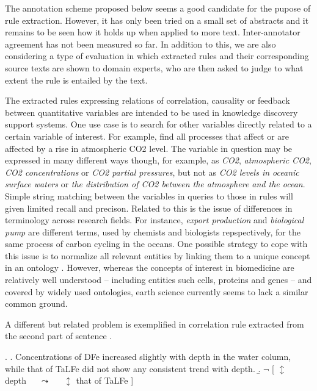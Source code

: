 \documentclass[10pt, a4paper]{article}
\begin{document}
The annotation scheme proposed below seems a good candidate for the pupose of rule extraction.
However, it has only been tried on a small set of abstracts and it remains to be seen how it holds up when applied to more text.
Inter-annotator agreement has not been measured so far.
In addition to this, we are also considering a type of evaluation in which extracted rules and their corresponding source texts are shown to domain experts, who are then asked to judge to what extent the rule is entailed by the text. 


The extracted rules expressing relations of correlation, causality or feedback between quantitative variables are intended to be used in knowledge discovery support systems.
One use case is to search for other variables directly related to a certain variable of interest.
For example, find all processes that affect or are affected by a rise in atmospheric CO2 level.
The variable in question may be expressed in many different ways though, for example, as \emph{CO2}, \emph{atmospheric CO2}, \emph{CO2 concentrations} or \emph{CO2 partial pressures}, but not as \emph{ CO2 levels in oceanic surface waters} or \emph{the distribution of CO2 between the atmosphere and the ocean}.
Simple string matching between the variables in queries to those in rules will given limited recall and precison.
Related to this is the issue of differences in terminology across research fields.
For instance, \emph{export production} and \emph{biological pump} are different terms, used by chemists and biologists repspectively, for the same process of carbon cycling in the oceans. 
One possible strategy to cope with this issue is to normalize all relevant entities by linking them to a unique concept in an ontology \cite{Bada2012Concept}.
However, whereas the concepts of interest in biomedicine are relatively well understood -- including entities such cells, proteins and genes -- and covered by widely used ontologies, earth science currently seems to lack a similar common ground.

A different but related problem is exemplified in correlation rule \Next[b] extracted from the second part of sentence \Next[a].

\exi. 
  \a. Concentrations of DFe increased slightly with depth in the water column, while that of TaLFe did not show any consistent trend with depth.
  \b. $\neg$ [ $\updownarrow$ depth~~~$\leadsto$~~~$\updownarrow$ that of TaLFe ]
\end{document}
